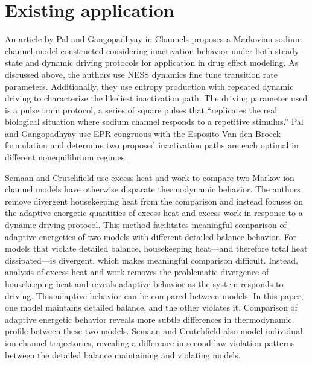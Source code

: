 \documentclass[%
 aip,
 amsmath,amssymb,
 reprint,%
]{revtex4-1}
\begin{document}
\section{Existing application}
An article by Pal and Gangopadhyay in Channels proposes a Markovian sodium channel model constructed considering inactivation behavior under both steady-state and dynamic driving protocols for application in drug effect modeling. As discussed above, the authors use NESS dynamics fine tune transition rate parameters. Additionally, they use entropy production with repeated dynamic driving to characterize the likeliest inactivation path. The driving parameter used is a pulse train protocol, a series of square pulses that ``replicates the real biological situation where sodium channel responds to a repetitive stimulus.'' Pal and Gangopadhyay use EPR congruous with the Esposito-Van den Broeck formulation and determine two proposed inactivation paths are each optimal in different nonequilibrium regimes.\cite{PAL2016}

Semaan and Crutchfield use excess heat and work to compare two Markov ion channel models have otherwise disparate thermodynamic behavior. The authors remove divergent housekeeping heat from the comparison and instead focuses on the adaptive energetic quantities of excess heat and excess work in response to a dynamic driving protocol. This method facilitates meaningful comparison of adaptive energetics of two models with different detailed-balance behavior. For models that violate detailed balance, housekeeping heat---and therefore total heat dissipated---is divergent, which makes meaningful comparison difficult. Instead, analysis of excess heat and work removes the problematic divergence of housekeeping heat and reveals adaptive behavior as the system responds to driving. This adaptive behavior can be compared between models. In this paper, one model maintains detailed balance, and the other violates it. Comparison of adaptive energetic behavior reveals more subtle differences in thermodynamic profile between these two models. Semaan and Crutchfield also model individual ion channel trajectories, revealing a difference in second-law violation patterns between the detailed balance maintaining and violating models.
\end{document}
